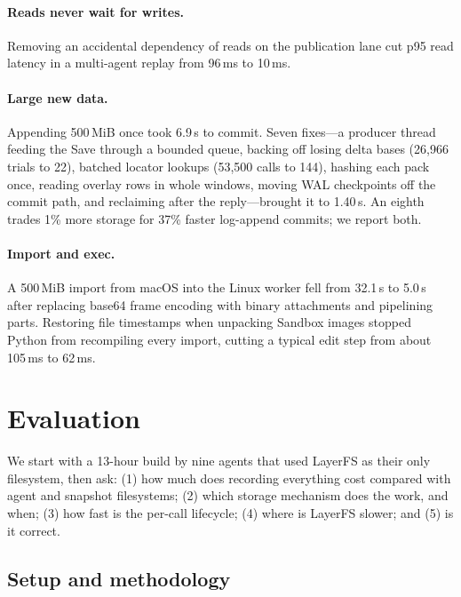 \documentclass[letterpaper,twocolumn,10pt]{article}
\newcommand{\sys}{LayerFS}
\begin{document}
\paragraph{Reads never wait for writes.} Removing an accidental dependency
of reads on the publication lane cut p95 read latency in a multi-agent
replay from 96\,ms to 10\,ms.

\paragraph{Large new data.} Appending 500\,MiB once took 6.9\,s to commit.
Seven fixes---a producer thread feeding the Save through a
bounded queue, backing off losing delta bases (26,966 trials to 22), batched
locator lookups (53,500 calls to 144), hashing each pack once, reading
overlay rows in whole windows, moving WAL checkpoints off the commit path,
and reclaiming after the reply---brought it to 1.40\,s. An eighth trades 1\%
more storage for 37\% faster log-append commits; we report both.

\paragraph{Import and exec.} A 500\,MiB import from macOS into the Linux
worker fell from 32.1\,s to 5.0\,s after replacing base64 frame encoding
with binary attachments and pipelining parts. Restoring file timestamps when
unpacking Sandbox images stopped Python from recompiling every import,
cutting a typical edit step from about 105\,ms to 62\,ms.

\section{Evaluation}
\label{sec:eval}

We start with a 13-hour build by nine agents that used \sys{} as their
only filesystem, then ask: (1) how much does recording everything cost
compared with agent and snapshot filesystems; (2) which storage mechanism
does the work, and when; (3) how fast is the per-call lifecycle; (4) where
is \sys{} slower; and (5) is it correct.

\subsection{Setup and methodology}
\end{document}
